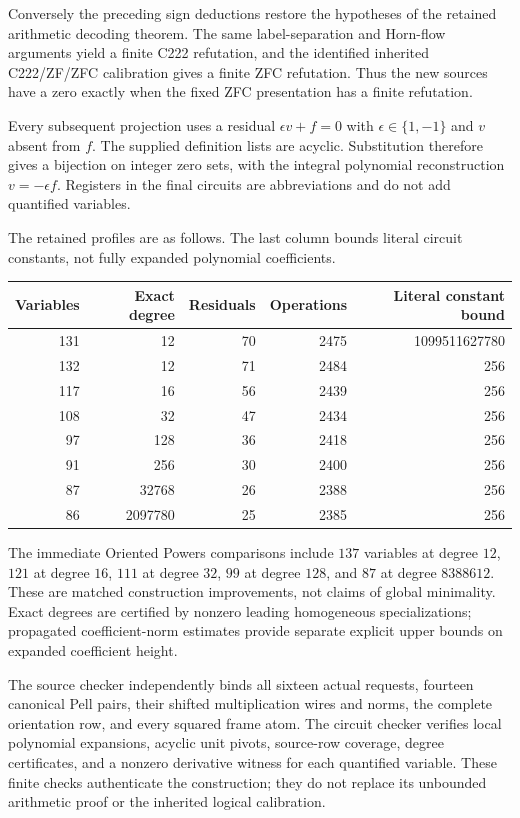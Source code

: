 Conversely the preceding sign deductions restore the hypotheses of the
retained arithmetic decoding theorem. The same label-separation and Horn-flow
arguments yield a finite C222 refutation, and the identified inherited
C222/ZF/ZFC calibration gives a finite ZFC refutation. Thus the new sources
have a zero exactly when the fixed ZFC presentation has a finite refutation.

Every subsequent projection uses a residual
$\epsilon v+f=0$ with $\epsilon\in\{1,-1\}$ and $v$ absent from $f$.
The supplied definition lists are acyclic. Substitution therefore gives a
bijection on integer zero sets, with the integral polynomial reconstruction
$v=-\epsilon f$. Registers in the final circuits are abbreviations and do
not add quantified variables.

The retained profiles are as follows. The last column bounds literal circuit
constants, not fully expanded polynomial coefficients.
\begin{center}
\begin{tabular}{rrrrr}
\hline
Variables & Exact degree & Residuals & Operations & Literal constant bound\\
\hline
131&12&70&2475&1099511627780\\
132&12&71&2484&256\\
117&16&56&2439&256\\
108&32&47&2434&256\\
97&128&36&2418&256\\
91&256&30&2400&256\\
87&32768&26&2388&256\\
86&2097780&25&2385&256\\
\hline
\end{tabular}
\end{center}

The immediate Oriented Powers comparisons include $137$ variables at degree
$12$, $121$ at degree $16$, $111$ at degree $32$, $99$ at degree $128$, and
$87$ at degree $8388612$. These are matched construction improvements, not
claims of global minimality. Exact degrees are certified by nonzero leading
homogeneous specializations; propagated coefficient-norm estimates provide
separate explicit upper bounds on expanded coefficient height.

The source checker independently binds all sixteen actual requests, fourteen
canonical Pell pairs, their shifted multiplication wires and norms, the
complete orientation row, and every squared frame atom. The circuit checker
verifies local polynomial expansions, acyclic unit pivots, source-row
coverage, degree certificates, and a nonzero derivative witness for each
quantified variable. These finite checks authenticate the construction;
they do not replace its unbounded arithmetic proof or the inherited logical
calibration.
